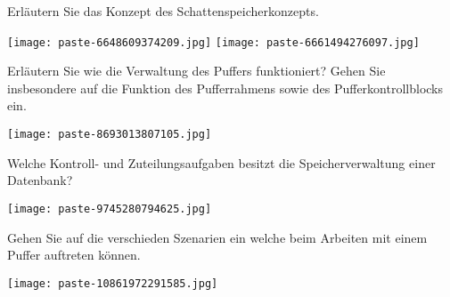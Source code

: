 \documentclass{article}
\begin{document}
\begin{tcolorbox}[colback=white!10!white,colframe=lightgray!75!black,
  savelowerto=\jobname_ex.tex]

\begin{center}
 Erläutern Sie das Konzept des 
Schattenspeicherkonzepts.
 

\end{center}

\tcblower

\justifying
\texttt{[image: paste-6648609374209.jpg]}
\texttt{[image: paste-6661494276097.jpg]}

\end{tcolorbox}
\begin{tcolorbox}[colback=white!10!white,colframe=lightgray!75!black,
  savelowerto=\jobname_ex.tex]

\begin{center}
 Erläutern Sie wie die Verwaltung des Puffers funktioniert? Gehen Sie insbesondere auf die Funktion des Pufferrahmens sowie des Pufferkontrollblocks ein. 

\end{center}

\tcblower

\justifying
\texttt{[image: paste-8693013807105.jpg]}

\end{tcolorbox}
\begin{tcolorbox}[colback=white!10!white,colframe=lightgray!75!black,
  savelowerto=\jobname_ex.tex]

\begin{center}
 Welche Kontroll- und Zuteilungsaufgaben besitzt die Speicherverwaltung einer Datenbank? 

\end{center}

\tcblower

\justifying
\texttt{[image: paste-9745280794625.jpg]}

\end{tcolorbox}
\begin{tcolorbox}[colback=white!10!white,colframe=lightgray!75!black,
  savelowerto=\jobname_ex.tex]

\begin{center}
 Gehen Sie auf die verschieden Szenarien ein welche beim Arbeiten mit einem Puffer auftreten können. 

\end{center}

\tcblower

\justifying
\texttt{[image: paste-10861972291585.jpg]}

\end{tcolorbox}
\end{document}
